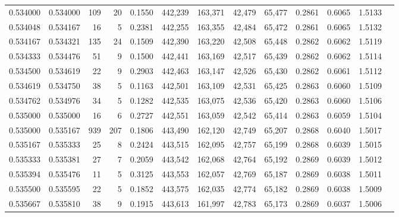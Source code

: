 \begin{tabular}{rrrrrrrrrrrrr}
0.534000 & 0.534000 &   109 &  20 &                                     0.1550 & 442,239 & 163,371 &  42,479 &  65,477 & 0.2861 & 0.6065 & 1.5133 \\
0.534048 & 0.534167 &    16 &   5 &                                     0.2381 & 442,255 & 163,355 &  42,484 &  65,472 & 0.2861 & 0.6065 & 1.5132 \\
0.534167 & 0.534321 &   135 &  24 &                                     0.1509 & 442,390 & 163,220 &  42,508 &  65,448 & 0.2862 & 0.6062 & 1.5119 \\
0.534333 & 0.534476 &    51 &   9 &                                     0.1500 & 442,441 & 163,169 &  42,517 &  65,439 & 0.2862 & 0.6062 & 1.5114 \\
0.534500 & 0.534619 &    22 &   9 &                                     0.2903 & 442,463 & 163,147 &  42,526 &  65,430 & 0.2862 & 0.6061 & 1.5112 \\
0.534619 & 0.534750 &    38 &   5 &                                     0.1163 & 442,501 & 163,109 &  42,531 &  65,425 & 0.2863 & 0.6060 & 1.5109 \\
0.534762 & 0.534976 &    34 &   5 &                                     0.1282 & 442,535 & 163,075 &  42,536 &  65,420 & 0.2863 & 0.6060 & 1.5106 \\
0.535000 & 0.535000 &    16 &   6 &                                     0.2727 & 442,551 & 163,059 &  42,542 &  65,414 & 0.2863 & 0.6059 & 1.5104 \\
0.535000 & 0.535167 &   939 & 207 &                                     0.1806 & 443,490 & 162,120 &  42,749 &  65,207 & 0.2868 & 0.6040 & 1.5017 \\
0.535167 & 0.535333 &    25 &   8 &                                     0.2424 & 443,515 & 162,095 &  42,757 &  65,199 & 0.2868 & 0.6039 & 1.5015 \\
0.535333 & 0.535381 &    27 &   7 &                                     0.2059 & 443,542 & 162,068 &  42,764 &  65,192 & 0.2869 & 0.6039 & 1.5012 \\
0.535394 & 0.535476 &    11 &   5 &                                     0.3125 & 443,553 & 162,057 &  42,769 &  65,187 & 0.2869 & 0.6038 & 1.5011 \\
0.535500 & 0.535595 &    22 &   5 &                                     0.1852 & 443,575 & 162,035 &  42,774 &  65,182 & 0.2869 & 0.6038 & 1.5009 \\
0.535667 & 0.535810 &    38 &   9 &                                     0.1915 & 443,613 & 161,997 &  42,783 &  65,173 & 0.2869 & 0.6037 & 1.5006 \\

\end{tabular}
